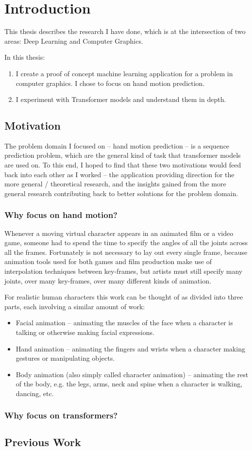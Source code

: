 \chapter{Introduction}
\label{C:intro}

This thesis describes the research I have done, which is at the intersection of two areas: Deep Learning and Computer Graphics.

In this thesis:
\begin{enumerate}
    \item I create a proof of concept machine learning application for a problem in computer graphics. I chose to focus on hand motion prediction.
    \item I experiment with Transformer models and understand them in depth.
\end{enumerate}

\section{Motivation}
\label{s:motivation}
The problem domain I focused on -- hand motion prediction -- is a sequence prediction problem, which are  the general kind of task that transformer models are used on. To this end, I hoped to find that these two motivations would feed back into each other as I worked -- the application providing direction for the more general / theoretical research, and the insights gained from the more general research contributing back to better solutions for the problem domain.

\subsection{Why focus on hand motion?}
\label{ss:why-hand-motion}

Whenever a moving virtual character appears in an animated film or a video game, someone had to spend the time to specify the angles of all the joints across all the frames. Fortunately is not necessary to lay out every single frame, because animation tools used for both games and film production make use of interpolation techniques between key-frames, but artists must still specify many joints, over many key-frames, over many different kinds of animation.

For realistic human characters this work can be thought of as divided into three parts, each involving a similar amount of work:
\begin{itemize}
    \item Facial animation -- animating the muscles of the face when a character is talking or otherwise making facial expressions.
    \item Hand animation -- animating the fingers and wrists when a character making gestures or manipulating objects.
    \item Body animation (also simply called character animation) -- animating the rest of the body, e.g. the legs, arms, neck and spine when a character is walking, dancing, etc.
\end{itemize}

\subsection{Why focus on transformers?}
\label{ss:why-transformers}


\section{Previous Work}